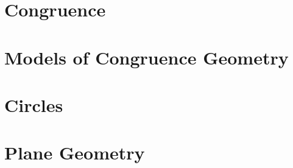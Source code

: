 \documentclass{memoir}
\begin{document}
  \section{Congruence}
    
    \newpage

  \section{Models of Congruence Geometry}
    
    \newpage

  \section{Circles}
    
    \newpage

  \section{Plane Geometry}
    

\backmatter
  \printindex
\end{document}

